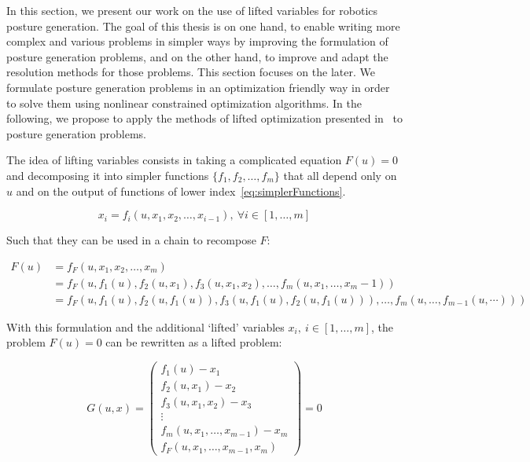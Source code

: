 In this section, we present our work on the use of lifted variables for robotics posture generation.
The goal of this thesis is on one hand, to enable writing more complex and various problems in simpler ways by improving the formulation of posture generation problems, and on the other hand, to improve and adapt the resolution methods for those problems.
This section focuses on the later.
We formulate posture generation problems in an optimization friendly way in order to solve them using nonlinear constrained optimization algorithms.
In the following, we propose to apply the methods of lifted optimization presented in~\cite{Albersmeyer:2010:LNM:1958447.1958472} to posture generation problems.

The idea of lifting variables consists in taking a complicated equation $F(u) = 0$ and decomposing it into simpler functions $\{f_1, f_2, \ldots, f_m\}$ that all depend only on $u$ and on the output of functions of lower index~\ref{eq:simplerFunctions}.

\begin{equation}
\label{eq:simplerFunctions}
  x_i = f_i(u, x_1, x_2, \ldots,x_{i-1}),\ \forall i\in[1,\ldots, m]
\end{equation}

Such that they can be used in a chain to recompose $F$:

\begin{align}
  F(u) &= f_F\left(u, x_1, x_2, \ldots, x_m\right)\\
       &= f_F\left(u, f_1(u), f_2(u,x_1), f_3(u,x_1,x_2), \ldots, f_m(u, x_1, \ldots, x_m-1)\right) \\
       &= f_F\left(u, f_1(u), f_2(u,f_1(u)), f_3(u,f_1(u),f_2(u,f_1(u))), \ldots, f_m(u, \ldots, f_{m-1}(u,\cdots))\right)
\end{align}

With this formulation and the additional `lifted' variables $x_i,\ i\in[1,\ldots, m]$, the problem $F(u) = 0$ can be rewritten as a lifted problem:

\begin{equation}
\label{eq:lifted_variables}
  G(u,x) =
  \begin{pmatrix}
  f_1(u) - x_1 \\
  f_2(u,x_1) - x_2 \\
  f_3(u,x_1,x_2) - x_3 \\
  \vdots \\
  f_m(u,x_1,\ldots, x_{m-1}) - x_m \\
  f_F(u,x_1,\ldots, x_{m-1}, x_m)
  \end{pmatrix}
  =0
\end{equation}

